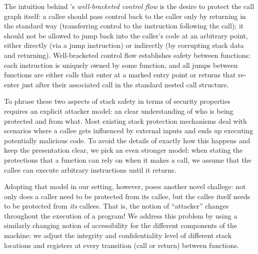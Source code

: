 \documentclass[acmsmall,review,anonymous]{acmart}\settopmatter{printfolios=true,printccs=false,printacmref=false}
\begin{document}
The intuition behind \citeauthor{Skorstengaard+19}'s {\em well-bracketed control
  flow} is
the desire to protect the call graph itself: a callee should pass control
back to the caller only by returning in the standard way (transferring
control to the instruction following the call); it should
not be
allowed to jump back into the caller's code at an arbitrary point, either
directly (via a jump instruction) or indirectly (by corrupting stack
data and returning). Well-bracketed control flow establishes safety
between functions: each instruction is uniquely owned by some
function, and all jumps between functions are either calls that enter
at a marked entry point or returns that re-enter just after their
associated call in the standard nested call structure.  

To phrase these two aspects of stack safety in terms of security
properties   requires an explicit attacker model: an clear
understanding of who is being protected and from what. Most existing
stack protection mechanisms deal with scenarios where a callee gets
influenced by external inputs and ends up executing potentially
malicious code. To avoid the details of exactly how this happens and
keep the presentation clear, we pick an even stronger model: when
stating the protections that a function can rely on when it makes a
call, we assume that the callee can execute arbitrary instructions
until it returns.

Adopting that model in our setting, however, poses another novel
challege: not only does a caller need to be protected from its callee,
but the callee itself needs to be protected from {\em its}
callees. That is, the notion of ``attacker'' changes throughout the
execution of a program!  We address this problem by using a similarly
changing notion of accessibility for the different components of the
machine: we adjust the integrity and confidentiality level of
different stack locations and registers at every transition (call or
return) between functions.  
\end{document}
